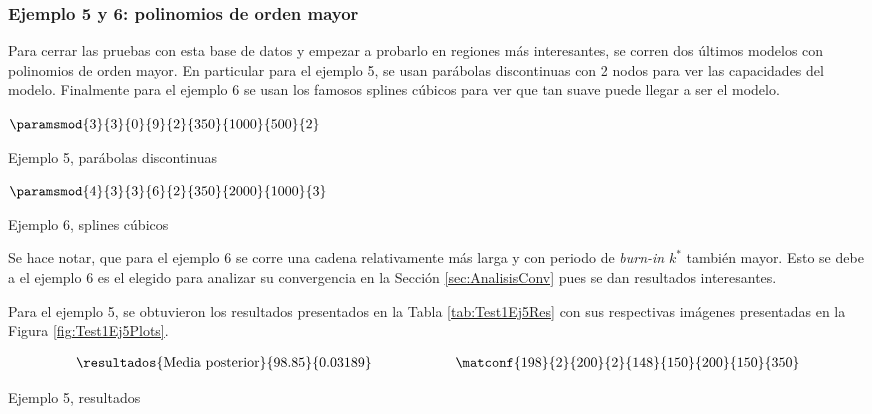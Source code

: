 \subsubsection*{Ejemplo 5 y 6: polinomios de orden mayor} \label{sec:Test1Ej6}
Para cerrar las pruebas con esta base de datos y empezar a probarlo en regiones más interesantes, se corren dos últimos modelos con polinomios de orden mayor. En particular para el ejemplo 5, se usan parábolas discontinuas con 2 nodos para ver las capacidades del modelo. Finalmente para el ejemplo 6 se usan los famosos splines cúbicos para ver que tan suave puede llegar a ser el modelo. 
\begin{table}
	\begin{subtable}{0.45\textwidth}
	\centering
	$\paramsmod{3}{3}{0}{9}{2}{350}{1000}{500}{2}$
	\caption{Ejemplo 5, parábolas discontinuas}
	\label{ej:5}
	\end{subtable}
	\quad
	\begin{subtable}{0.45\textwidth}
	\centering
	$\paramsmod{4}{3}{3}{6}{2}{350}{2000}{1000}{3}$	
	\caption{Ejemplo 6, splines cúbicos}
	\label{ej:6}
	\end{subtable}
\end{table}

Se hace notar, que para el ejemplo 6 se corre una cadena relativamente más larga y con periodo de \textit{burn-in} $k^*$ también mayor. Esto se debe a el ejemplo 6 es el elegido para analizar su convergencia en la Sección \ref{sec:AnalisisConv} pues se dan resultados interesantes.

Para el ejemplo 5, se obtuvieron los resultados presentados en la Tabla \ref{tab:Test1Ej5Res} con sus respectivas imágenes presentadas en la Figura \ref{fig:Test1Ej5Plots}.
\begin{table}[h]
\begin{align*}
\resultados{\text{Media posterior}}{98.85}{0.03189}
\qquad\qquad\qquad
\matconf{198}{2}{200}{2}{148}{150}{200}{150}{350}
\end{align*}
\caption{Ejemplo 5, resultados}
\label{tab:Test1Ej5Res}
\end{table}

